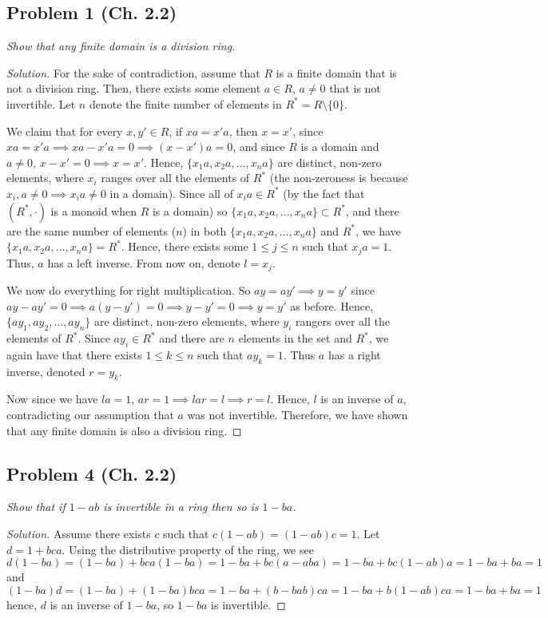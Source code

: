 \documentclass{article}
\begin{document}
\subsection*{Problem 1 (Ch. 2.2)}
{\it Show that any finite domain is a division ring.}
\begin{proof}[Solution]\let\qed\relax
	For the sake of contradiction, assume that $R$ is a finite domain that is not a division ring.
	Then, there exists some element $a \in R$, $a\neq 0$ that is not invertible.
	Let $n$ denote the finite number of elements in $R^* = R \setminus \{0\}$.

	We claim that for every $x,y' \in R$, if $xa = x'a$, then $x=x'$,
	since $xa = x'a \implies xa - x'a = 0 \implies (x-x')a = 0$,
	and since $R$ is a domain and $a \neq 0$, $x - x' = 0 \implies x = x'$.
	Hence, $\{x_1a,x_2a,\dots,x_na\}$ are distinct, non-zero elements,
	where $x_i$ ranges over all the elements of $R^*$
	(the non-zeroness is because $x_i,a \neq 0 \implies x_ia\neq0$ in a domain).
	Since all of $x_ia \in R^*$
	(by the fact that $(R^*,\cdot)$ is a monoid when $R$ is a domain)
	so $\{x_1a,x_2a,\dots,x_na\} \subset R^*$,
	and there are the same number of elements ($n$)
	in both $\{x_1a,x_2a,\dots,x_na\}$ and $R^*$, we have
	$\{x_1a,x_2a,\dots,x_na\} = R^*$.
	Hence, there exists some $1 \leq j \leq n$ such that $x_ja = 1$.
	Thus, $a$ has a left inverse.
	From now on, denote $l = x_j$.
	
	We now do everything for right multiplication.
	So $ay = ay' \implies y = y'$ since
	$ay - ay' = 0 \implies a(y-y') = 0 \implies y - y' = 0 \implies y = y'$
	as before.
	Hence, $\{ay_1,ay_2,\dots,ay_n\}$ are distinct, non-zero elements,
	where $y_i$ rangers over all the elements of $R^*$.
	Since $ay_i \in R^*$ and there are $n$ elements in the set and $R^*$,
	we again have that there exists $1 \leq k \leq n$ such that $ay_k = 1$.
	Thus $a$ has a right inverse, denoted $r = y_k$.

	Now since we have $la = 1$, $ar = 1 \implies lar = l \implies r = l$.
	Hence, $l$ is an inverse of $a$, contradicting our assumption that
	$a$ was not invertible.
	Therefore, we have shown that any finite domain is also a division ring.
\end{proof}

\subsection*{Problem 4 (Ch. 2.2)}
{\it Show that if $1 - ab$ is invertible in a ring then so is $1 - ba$.}
\begin{proof}[Solution]\let\qed\relax
	Assume there exists $c$ such that $c(1-ab) = (1-ab)c = 1$.
	Let $d = 1 + bca$.
	Using the distributive property of the ring, we see
	\[
		d(1-ba) = (1 - ba) + bca(1 - ba)
		= 1 - ba + bc(a - aba) =
		1 - ba + bc(1 - ab)a = 1 - ba + ba = 1
	\]
	and
	\[
		(1-ba)d = (1 - ba) + (1 - ba)bca
		= 1 - ba + (b - bab)ca =
		1 - ba + b(1 - ab)ca = 1 - ba + ba = 1
	\]
	hence, $d$ is an inverse of $1 - ba$,
	so $1- ba$ is invertible.
\end{proof}
\end{document}
